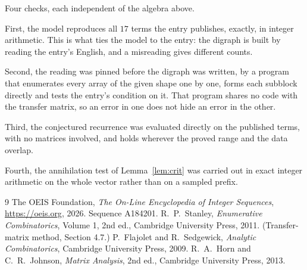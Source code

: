 \documentclass[11pt,a4paper]{article}
\theoremstyle{plain}
\theoremstyle{definition}
\begin{document}
Four checks, each independent of the algebra above.

First, the model reproduces all $17$ terms the entry publishes, exactly, in integer
arithmetic. This is what ties the model to the entry: the digraph is built by reading the
entry's English, and a misreading gives different counts.

Second, the reading was pinned before the digraph was written, by a program that enumerates
every array of the given shape one by one, forms each subblock directly and tests the entry's
condition on it. That program shares no code with the transfer matrix, so an error in one does
not hide an error in the other.

Third, the conjectured recurrence was evaluated directly on the published terms, with no
matrices involved, and holds wherever the proved range and the data overlap.

Fourth, the annihilation test of Lemma~\ref{lem:crit} was carried out in exact integer
arithmetic on the whole vector rather than on a sampled prefix.

\begin{thebibliography}{9}
 The OEIS Foundation, \emph{The On-Line Encyclopedia of Integer
Sequences}, \url{https://oeis.org}, 2026. Sequence A184201.
 R.~P.~Stanley, \emph{Enumerative Combinatorics}, Volume 1, 2nd ed.,
Cambridge University Press, 2011. (Transfer-matrix method, Section 4.7.)
 P.~Flajolet and R.~Sedgewick, \emph{Analytic Combinatorics}, Cambridge
University Press, 2009.
 R.~A.~Horn and C.~R.~Johnson, \emph{Matrix Analysis}, 2nd ed., Cambridge
University Press, 2013.
\end{thebibliography}
\end{document}
